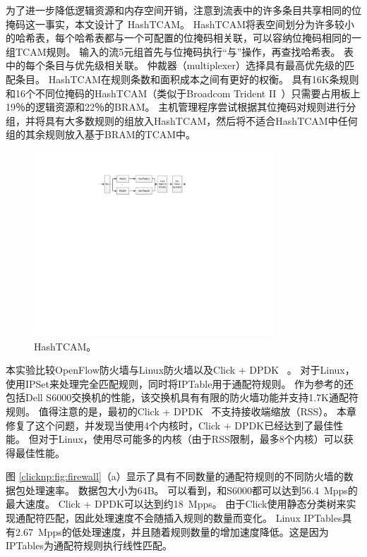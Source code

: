 为了进一步降低逻辑资源和内存空间开销，注意到流表中的许多条目共享相同的位掩码这一事实，本文设计了 HashTCAM。
HashTCAM将表空间划分为许多较小的哈希表，每个哈希表都与一个可配置的位掩码相关联，可以容纳位掩码相同的一组TCAM规则。
输入的流5元组首先与位掩码执行``与''操作，再查找哈希表。
表中的每个条目与优先级相关联。
仲裁器（multiplexer）选择具有最高优先级的匹配条目。
HashTCAM在规则条数和面积成本之间有更好的权衡。
具有16K条规则和16个不同位掩码的HashTCAM（类似于Broadcom Trident II~\cite {broadcomethernet}）只需要占用板上19％的逻辑资源和22％的BRAM。
主机管理程序尝试根据其位掩码对规则进行分组，并将具有大多数规则的组放入HashTCAM，然后将不适合HashTCAM中任何组的其余规则放入基于BRAM的TCAM中。



\begin{figure}[htbp]
	\centering
	\includegraphics[width=0.8\textwidth]{image/HashTCAM}
	\caption{HashTCAM。}
	\label{clicknp:fig:hashtcam}
\end{figure}



本实验比较OpenFlow防火墙与Linux防火墙以及Click + DPDK~ \cite {barbette2015fast}。
对于Linux，使用IPSet来处理完全匹配规则，同时将IPTable用于通配符规则。
作为参考的还包括Dell S6000交换机的性能，该交换机具有有限的防火墙功能并支持1.7K通配符规则。
值得注意的是，最初的Click + DPDK~ \cite {barbette2015fast}不支持接收端缩放（RSS）。
本章修复了这个问题，并发现当使用4个内核时，Click + DPDK已经达到了最佳性能。
但对于Linux，使用尽可能多的内核（由于RSS限制，最多8个内核）可以获得最佳性能。

图 \ref {clicknp:fig:firewall}（a）显示了具有不同数量的通配符规则的不同防火墙的数据包处理速率。
数据包大小为64B。
可以看到，\name 和S6000都可以达到56.4~Mpps的最大速度。
Click + DPDK可以达到约18~Mpps。
由于Click使用静态分类树来实现通配符匹配，因此处理速度不会随插入规则的数量而变化。
Linux IPTables具有2.67~Mpps的低处理速度，并且随着规则数量的增加速度降低。这是因为IPTables为通配符规则执行线性匹配。

